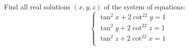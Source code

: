 Find all real solutions $(x,y,z)$ of the system of equations:
\[
\begin{cases}
 \tan ^2x+2\cot^22y=1 \\ 
 \tan^2y+2\cot^22z=1  \\
  \tan^2z+2\cot^22x=1  \\
\end{cases}
\]